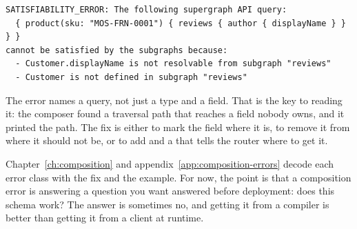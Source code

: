 \begin{verbatim}
SATISFIABILITY_ERROR: The following supergraph API query:
  { product(sku: "MOS-FRN-0001") { reviews { author { displayName } } } }
cannot be satisfied by the subgraphs because:
  - Customer.displayName is not resolvable from subgraph "reviews"
  - Customer is not defined in subgraph "reviews"
\end{verbatim}

The error names a query, not just a type and a field. That is the key to reading
it: the composer found a traversal path that reaches a field nobody owns, and it
printed the path. The fix is either to mark the field  where it
is, to remove it from where it should not be, or to add  and a
 that tells the router where to get it.

Chapter~\ref{ch:composition} and appendix~\ref{app:composition-errors} decode
each error class with the fix and the example. For now, the point is that a
composition error is answering a question you want answered before deployment:
does this schema work? The answer is sometimes no, and getting it from a
compiler is better than getting it from a client at runtime.

%
